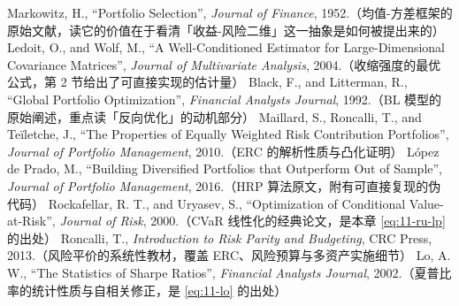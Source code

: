 \begin{furtherreading}
   Markowitz, H., ``Portfolio Selection'', \emph{Journal of Finance}, 1952.（均值-方差框架的原始文献，读它的价值在于看清「收益-风险二维」这一抽象是如何被提出来的）
   Ledoit, O., and Wolf, M., ``A Well-Conditioned Estimator for Large-Dimensional Covariance Matrices'', \emph{Journal of Multivariate Analysis}, 2004.（收缩强度的最优公式，第 2 节给出了可直接实现的估计量）
   Black, F., and Litterman, R., ``Global Portfolio Optimization'', \emph{Financial Analysts Journal}, 1992.（BL 模型的原始阐述，重点读「反向优化」的动机部分）
   Maillard, S., Roncalli, T., and Teïletche, J., ``The Properties of Equally Weighted Risk Contribution Portfolios'', \emph{Journal of Portfolio Management}, 2010.（ERC 的解析性质与凸化证明）
   López de Prado, M., ``Building Diversified Portfolios that Outperform Out of Sample'', \emph{Journal of Portfolio Management}, 2016.（HRP 算法原文，附有可直接复现的伪代码）
   Rockafellar, R. T., and Uryasev, S., ``Optimization of Conditional Value-at-Risk'', \emph{Journal of Risk}, 2000.（CVaR 线性化的经典论文，是本章 \cref{eq:11-ru-lp} 的出处）
   Roncalli, T., \emph{Introduction to Risk Parity and Budgeting}, CRC Press, 2013.（风险平价的系统性教材，覆盖 ERC、风险预算与多资产实施细节）
   Lo, A. W., ``The Statistics of Sharpe Ratios'', \emph{Financial Analysts Journal}, 2002.（夏普比率的统计性质与自相关修正，是 \cref{eq:11-lo} 的出处）
\end{furtherreading}
